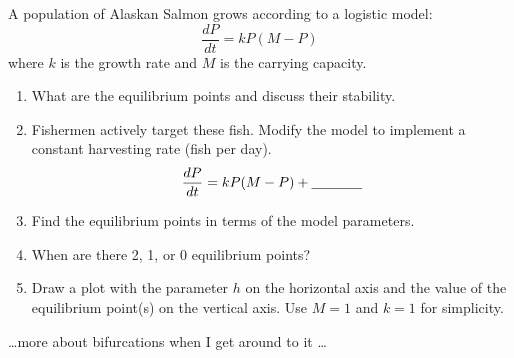 \begin{problem}
    A population of Alaskan Salmon grows according to a logistic model:
    \[ \frac{dP}{dt} = kP(M-P) \]
    where $k$ is the growth rate and $M$ is the carrying capacity.  
    \begin{enumerate}
        \item What are the equilibrium points and discuss their stability.
        \item Fishermen actively target these fish.  Modify the model to implement a
            constant harvesting rate (fish per day).
            \[ \frac{dP}{dt} = kP(M-P) + \underline{\hspace{0.5in}} \]
        \item Find the equilibrium points in terms of the model parameters.
        \item When are there 2, 1, or 0 equilibrium points?
        \item Draw a plot with the parameter $h$ on the horizontal axis and the value of
            the equilibrium point(s) on the vertical axis. Use $M = 1$ and $k = 1$ for
            simplicity.
    \end{enumerate}
\end{problem}



\ldots more about bifurcations when I get around to it \ldots


